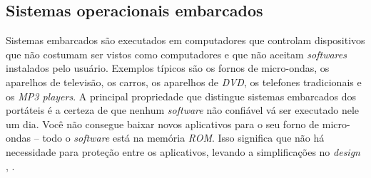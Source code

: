 \subsection{Sistemas operacionais embarcados}

Sistemas embarcados são executados em computadores que controlam dispositivos que não costumam ser vistos como computadores e que não aceitam \emph{softwares} instalados pelo usuário. Exemplos típicos são os fornos de micro-ondas, os aparelhos de televisão, os carros, os aparelhos de \emph{DVD}, os telefones tradicionais e os \emph{MP3 players}. A principal propriedade que distingue sistemas embarcados dos portáteis é a certeza de que nenhum \emph{software} não confiável vá ser executado nele um dia. Você não consegue baixar novos aplicativos para o seu forno de micro-ondas – todo o \emph{software} está na memória \emph{ROM}. Isso significa que não há necessidade para proteção entre os aplicativos, levando a simplificações no \emph{design} \cite{Tanenbaum2016}, \cite{Comer2012}.\\ 
